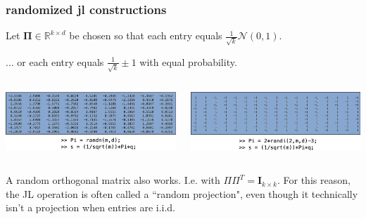 \documentclass[compress,handout]{beamer}
\newcommand{\bs}[1]{\boldsymbol{#1}}
\newcommand{\bv}[1]{\mathbf{#1}}
\newcommand{\R}{\mathbb{R}}
\begin{document}
\begin{frame}
	\frametitle{randomized jl constructions}
	\begin{center}
		Let $\bs{\Pi} \in \R^{k\times d}$ be chosen so that each entry equals $\frac{1}{\sqrt{k}}  \mathcal{N}(0,1)$.
		
		... or each entry equals $\frac{1}{\sqrt{k}}  \pm 1$ with equal probability.
	\end{center}
	\vspace{1em}
	
	\begin{columns}
		\begin{column}{0.5\textwidth}
			\includegraphics[width=\textwidth]{rand_gauss.png}
		\end{column}
		\begin{column}{0.5\textwidth}
			\includegraphics[width=\textwidth]{rand_sign.png}
		\end{column}
	\end{columns}
	
	\begin{center}
		A random orthogonal matrix also works. I.e. with $\Pi\Pi^T = \bv{I}_{k\times k}$. For this reason, the JL operation is often called a ``random projection", even though it technically isn't a projection when entries are i.i.d.
	\end{center}
\end{frame}
\end{document}
